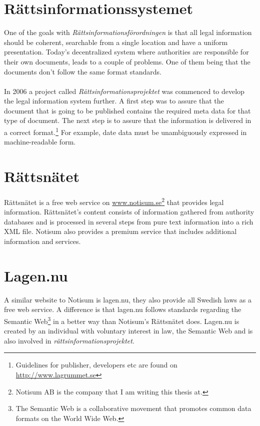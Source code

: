 \documentclass[a4paper,11pt]{kth-mag}
\begin{document}
\section{Rättsinformationssystemet}
One of the goals with \textit{Rättsinformationsförordningen} is that all legal information should be coherent, 
searchable from a single location and have a uniform presentation. Today’s decentralized system where 
authorities are responsible for their own documents, leads to a couple of problems. One of them being that 
the documents don’t follow the same format standards.\\\\ 
In 2006 a project called \textit{Rättsinformationsprojektet} was commenced to develop the legal information system further. 
A first step was to assure that the document that is going to be published contains the required meta data 
for that type of document. The next step is to assure that the information is delivered in a correct format.\footnote{Guidelines for publisher, developers etc are found on \url{http://www.lagrummet.se}} For example, date data must be unambiguously expressed in machine-readable form. 

\section{Rättsnätet} Rättsnätet is a free web service on
\url{www.notisum.se}\footnote{Notisum AB is the company that I am writing this thesis at.} that provides legal
information. Rättsnätet’s content consists of information gathered from
authority databases and is processed in several steps from pure text information
into a rich XML file. Notisum also provides a premium service that includes
additional information and services.

\section{Lagen.nu}
A similar website to Notisum is lagen.nu, they also provide all Swedish laws as a free web service. A difference is that lagen.nu follows standards regarding the Semantic Web\footnote{The Semantic Web is a collaborative movement that promotes common data formats on the World Wide Web.} in a better way than Notisum's Rättsnätet does. Lagen.nu is created by an individual with voluntary interest in law, the Semantic Web and is also involved in \textit{rättsinformationsprojektet}. 
\end{document}
